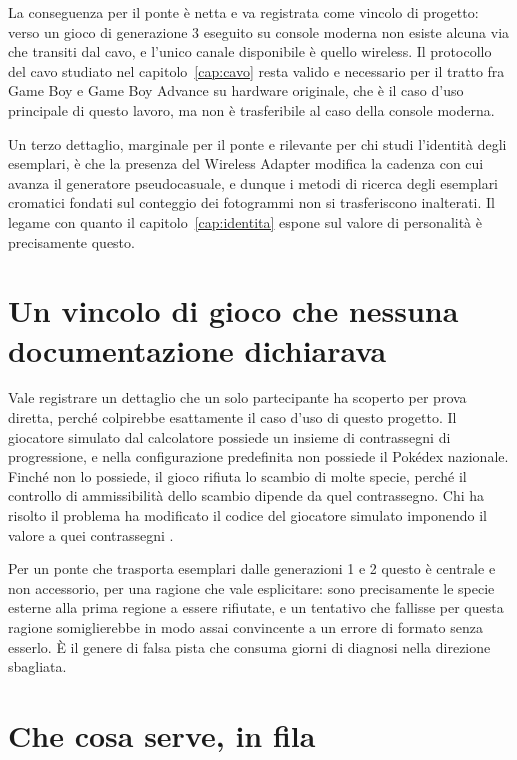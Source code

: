 La conseguenza per il ponte è netta e va registrata come vincolo di progetto: verso un gioco di generazione 3 eseguito su console moderna non esiste alcuna via che transiti dal cavo, e l'unico canale disponibile è quello wireless. Il protocollo del cavo studiato nel capitolo~\ref{cap:cavo} resta valido e necessario per il tratto fra Game Boy e Game Boy Advance su hardware originale, che è il caso d'uso principale di questo lavoro, ma non è trasferibile al caso della console moderna.

Un terzo dettaglio, marginale per il ponte e rilevante per chi studi l'identità degli esemplari, è che la presenza del Wireless Adapter modifica la cadenza con cui avanza il generatore pseudocasuale, e dunque i metodi di ricerca degli esemplari cromatici fondati sul conteggio dei fotogrammi non si trasferiscono inalterati. Il legame con quanto il capitolo~\ref{cap:identita} espone sul valore di personalità è precisamente questo.

\section{Un vincolo di gioco che nessuna documentazione dichiarava}

Vale registrare un dettaglio che un solo partecipante ha scoperto per prova diretta, perché colpirebbe esattamente il caso d'uso di questo progetto. Il giocatore simulato dal calcolatore possiede un insieme di contrassegni di progressione, e nella configurazione predefinita non possiede il Pokédex nazionale. Finché non lo possiede, il gioco rifiuta lo scambio di molte specie, perché il controllo di ammissibilità dello scambio dipende da quel contrassegno. Chi ha risolto il problema ha modificato il codice del giocatore simulato imponendo il valore  a quei contrassegni \cite{pmr-discord}.

Per un ponte che trasporta esemplari dalle generazioni 1 e 2 questo è centrale e non accessorio, per una ragione che vale esplicitare: sono precisamente le specie esterne alla prima regione a essere rifiutate, e un tentativo che fallisse per questa ragione somiglierebbe in modo assai convincente a un errore di formato senza esserlo. È il genere di falsa pista che consuma giorni di diagnosi nella direzione sbagliata.

\section{Che cosa serve, in fila}

